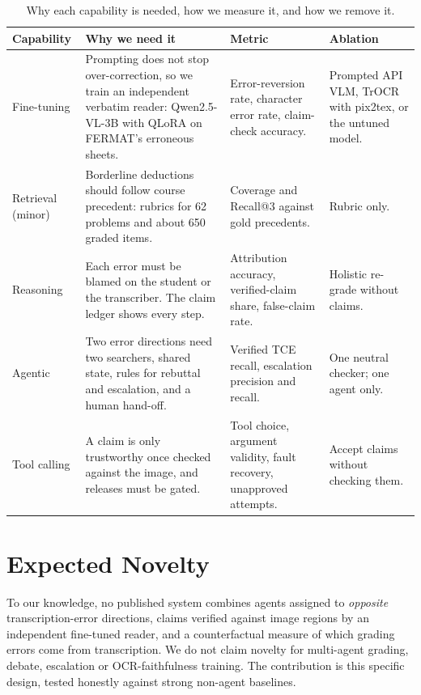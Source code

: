 \documentclass[11pt,a4paper]{article}
\begin{document}
\begin{table}[!h]\centering\caption{\small Why each capability is needed, how we measure it, and how we remove it.}\label{tab:caps}\vspace{3pt}
\footnotesize
\begin{tabularx}{\textwidth}{@{}P{1.7cm}YYP{3.4cm}@{}}
\toprule
Capability & Why we need it & Metric & Ablation \\
\midrule
Fine-tuning & Prompting does not stop over-correction, so we train an independent verbatim reader: Qwen2.5-VL-3B with QLoRA on FERMAT's erroneous sheets. & Error-reversion rate, character error rate, claim-check accuracy. & Prompted API VLM, TrOCR with pix2tex, or the untuned model. \\
Retrieval (minor) & Borderline deductions should follow course precedent: rubrics for 62 problems and about 650 graded items. & Coverage and Recall@3 against gold precedents. & Rubric only. \\
Reasoning & Each error must be blamed on the student or the transcriber. The claim ledger shows every step. & Attribution accuracy, verified-claim share, false-claim rate. & Holistic re-grade without claims. \\
Agentic & Two error directions need two searchers, shared state, rules for rebuttal and escalation, and a human hand-off. & Verified TCE recall, escalation precision and recall. & One neutral checker; one agent only. \\
Tool calling & A claim is only trustworthy once checked against the image, and releases must be gated. & Tool choice, argument validity, fault recovery, unapproved attempts. & Accept claims without checking them. \\
\bottomrule
\end{tabularx}
\end{table}

\section{Expected Novelty}
To our knowledge, no published system combines agents assigned to \emph{opposite} transcription-error directions, claims verified against image regions by an independent fine-tuned reader, and a counterfactual measure of which grading errors come from transcription. We do not claim novelty for multi-agent grading, debate, escalation or OCR-faithfulness training. The contribution is this specific design, tested honestly against strong non-agent baselines.
\end{document}
